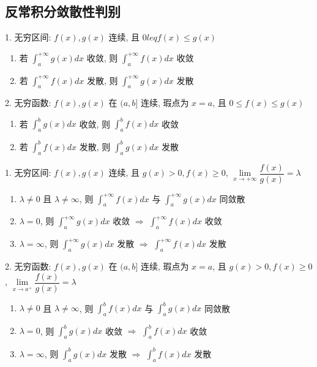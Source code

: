 \subsection*{反常积分敛散性判别}
\begin{theorem}[比较判别法]
	1. 无穷区间: $f(x),g(x)$ 连续, 且 $0 leq f(x) \leq g(x)$
	\begin{enumerate}
		\item 若 $\int_{a}^{+\infty}g(x)dx$ 收敛, 则 $\int_{a}^{+\infty}f(x)dx$ 收敛
		\item 若 $\int_{a}^{+\infty}f(x)dx$ 发散, 则 $\int_{a}^{+\infty}g(x)dx$ 发散
	\end{enumerate}

	2. 无穷函数: $f(x),g(x)$ 在 $(a,b]$ 连续, 瑕点为 $x=a$, 且 $0\leq f(x)\leq g(x)$
	\begin{enumerate}
		\item 若 $\int_{a}^{b}g(x)dx$ 收敛, 则 $\int_{a}^{b}f(x)dx$ 收敛
		\item 若 $\int_{a}^{b}f(x)dx$ 发散, 则 $\int_{a}^{b}g(x)dx$ 发散
	\end{enumerate}
\end{theorem}

\begin{theorem}[比较判别法的极限形式]
	1. 无穷区间: $f(x),g(x)$ 连续, 且 $g(x)>0, f(x)\geq 0$, $\lim\limits_{x\to +\infty}\dfrac{f(x)}{g(x)}=\lambda$
	\begin{enumerate}
		\item $\lambda\neq 0$ 且 $\lambda \neq \infty$, 则 $\int_{a}^{+\infty}f(x)dx$ 与 $\int_{a}^{+\infty}g(x)dx$ 同敛散
		\item $\lambda = 0$, 则 $\int_{a}^{+\infty}g(x)dx$ 收敛 $\Rightarrow$ $\int_{a}^{+\infty}f(x)dx$ 收敛
		\item $\lambda = \infty$, 则 $\int_{a}^{+\infty}g(x)dx$ 发散 $\Rightarrow$ $\int_{a}^{+\infty}f(x)dx$ 发散
	\end{enumerate}

	2. 无穷函数: $f(x),g(x)$ 在 $(a,b]$ 连续, 瑕点为 $x=a$, 且 $g(x)>0, f(x)\geq 0$, $\lim\limits_{x\to a^{+}}\dfrac{f(x)}{g(x)}=\lambda$
	\begin{enumerate}
		\item $\lambda\neq 0$ 且 $\lambda \neq \infty$, 则 $\int_{a}^{b}f(x)dx$ 与 $\int_{a}^{b}g(x)dx$ 同敛散
		\item $\lambda = 0$, 则 $\int_{a}^{b}g(x)dx$ 收敛 $\Rightarrow$ $\int_{a}^{b}f(x)dx$ 收敛
		\item $\lambda = \infty$, 则 $\int_{a}^{b}g(x)dx$ 发散 $\Rightarrow$ $\int_{a}^{b}f(x)dx$ 发散
	\end{enumerate}
\end{theorem}

